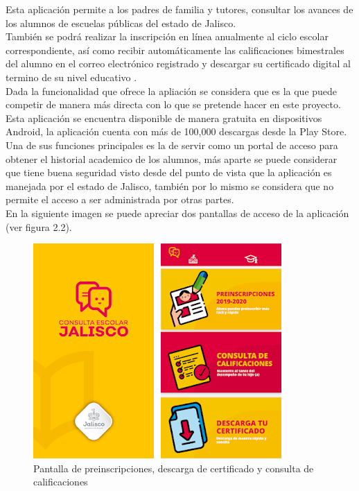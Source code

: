             Esta aplicación permite a los padres de familia y tutores, consultar los avances de los alumnos de escuelas públicas del estado de Jalisco. \\ También se podrá realizar la inscripción en línea anualmente al ciclo escolar correspondiente, así como recibir automáticamente las calificaciones bimestrales del alumno en el correo electrónico registrado y descargar su certificado digital al termino de su nivel educativo \cite{consulta}. \\ Dada la funcionalidad que ofrece la apliación se considera que es la que puede competir de manera más directa con lo que se pretende hacer en este proyecto. \\ Esta aplicación se encuentra disponible de manera gratuita en dispositivos Android, la aplicación cuenta con más de 100,000 descargas desde la Play Store. \\ Una de sus funciones principales es la de servir como un portal de acceso para obtener el historial academico de los alumnos, más aparte se puede considerar que tiene buena seguridad visto desde del punto de vista que la aplicación es manejada por el estado de Jalisco, también por lo mismo se considera que no permite el acceso a ser administrada por otras partes. \\ En la siguiente imagen se puede apreciar dos pantallas de acceso de la aplicación (ver figura 2.2).
            
            \begin{figure}[H]
                \centering
                \includegraphics[scale=0.8]{imagenes/consulta_escolar_jalisco_2.png}
                \caption{Pantalla de preinscripciones, descarga de certificado y consulta de calificaciones}
                \label{fig:consultaescolarjalisco2}
            \end{figure}


